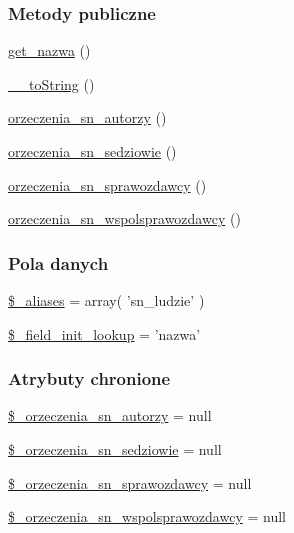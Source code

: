 \subsubsection*{Metody publiczne}
\begin{DoxyCompactItemize}
\item 
\hyperlink{classep___s_n___osoba_ac0818f0049d7b84f08f77128f54cee36}{get\-\_\-nazwa} ()
\item 
\hyperlink{classep___s_n___osoba_a7516ca30af0db3cdbf9a7739b48ce91d}{\-\_\-\-\_\-to\-String} ()
\item 
\hyperlink{classep___s_n___osoba_ad1853509afa0c61a80737e642e6ac4b3}{orzeczenia\-\_\-sn\-\_\-autorzy} ()
\item 
\hyperlink{classep___s_n___osoba_a27c2edb4c314d7f1b6e15e46fd4f29f3}{orzeczenia\-\_\-sn\-\_\-sedziowie} ()
\item 
\hyperlink{classep___s_n___osoba_af7d6fce395a80d9a1fce72e15a178bc2}{orzeczenia\-\_\-sn\-\_\-sprawozdawcy} ()
\item 
\hyperlink{classep___s_n___osoba_a9fbf7de2cd78bb13631c5b55dd7c9d96}{orzeczenia\-\_\-sn\-\_\-wspolsprawozdawcy} ()
\end{DoxyCompactItemize}
\subsubsection*{Pola danych}
\begin{DoxyCompactItemize}
\item 
\hyperlink{classep___s_n___osoba_ab4e31d75f0bc5d512456911e5d01366b}{\$\-\_\-aliases} = array( 'sn\-\_\-ludzie' )
\item 
\hyperlink{classep___s_n___osoba_a4a4d54ae35428077a7c61ec8a5139af3}{\$\-\_\-field\-\_\-init\-\_\-lookup} = 'nazwa'
\end{DoxyCompactItemize}
\subsubsection*{Atrybuty chronione}
\begin{DoxyCompactItemize}
\item 
\hyperlink{classep___s_n___osoba_a1631803c32c7cbe2dfd7642d66fdffeb}{\$\-\_\-orzeczenia\-\_\-sn\-\_\-autorzy} = null
\item 
\hyperlink{classep___s_n___osoba_a87a2b9afde5e31d31c0d136ea7de8c94}{\$\-\_\-orzeczenia\-\_\-sn\-\_\-sedziowie} = null
\item 
\hyperlink{classep___s_n___osoba_aa9207c65eeb1a9686772f302fcaa2f3a}{\$\-\_\-orzeczenia\-\_\-sn\-\_\-sprawozdawcy} = null
\item 
\hyperlink{classep___s_n___osoba_a1b717768eb8101ecc84cb85e8109ba25}{\$\-\_\-orzeczenia\-\_\-sn\-\_\-wspolsprawozdawcy} = null
\end{DoxyCompactItemize}
